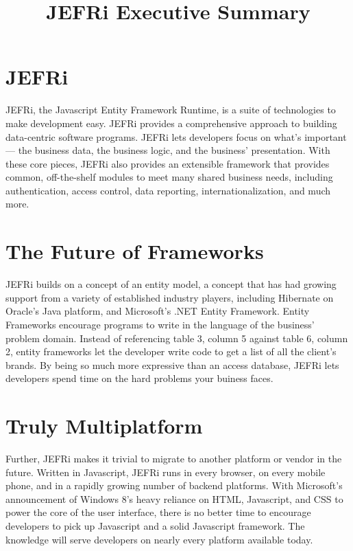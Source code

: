 \documentclass{article}
\begin{document}
\title{JEFRi Executive Summary}
\maketitle
\tableofcontents
\newpage
\linespread{1.6}

\section{JEFRi}
JEFRi, the Javascript Entity Framework Runtime, is a suite of technologies to
make development easy. JEFRi provides a comprehensive approach to building
data-centric software programs. JEFRi lets developers focus on what's important
--- the business data, the business logic, and the business' presentation. With
these core pieces, JEFRi also provides an extensible framework that provides
common, off-the-shelf modules to meet many shared business needs, including
authentication, access control, data reporting, internationalization, and much
more.

\section{The Future of Frameworks}
JEFRi builds on a concept of an entity model, a concept that has had growing
support from a variety of established industry players, including Hibernate on
Oracle's Java platform, and Microsoft's .NET Entity Framework. Entity Frameworks
encourage programs to write in the language of the business' problem domain.
Instead of referencing table 3, column 5 against table 6, column 2, entity
frameworks let the developer write code to get a list of all the client's
brands. By being so much more expressive than an access database, JEFRi lets
developers spend time on the hard problems your buiness faces.

\section{Truly Multiplatform}
Further, JEFRi makes it trivial to migrate to another platform or vendor in the
future. Written in Javascript, JEFRi runs in every browser, on every mobile
phone, and in a rapidly growing number of backend platforms. With Microsoft's
announcement of Windows 8's heavy reliance on HTML, Javascript, and CSS to power
the core of the user interface, there is no better time to encourage developers
to pick up Javascript and a solid Javascript framework. The knowledge will serve
developers on nearly every platform available today.
\end{document}
